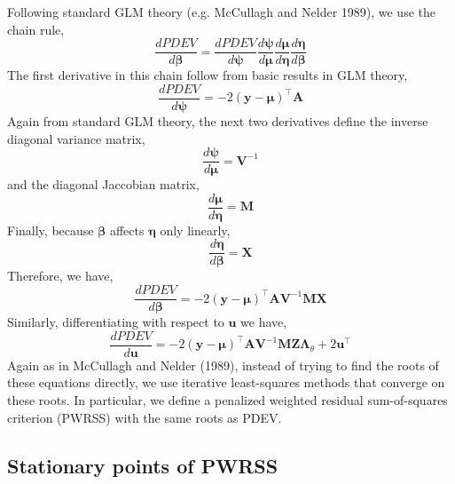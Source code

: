 \documentclass{jss}
\begin{document}
Following standard GLM theory (e.g. McCullagh and Nelder 1989), we use the chain rule,
\begin{displaymath}
\frac{d PDEV}{d \bm\beta} = 
\frac{d PDEV}{d \bm\psi}
\frac{d \bm\psi}{d \bm\mu}
\frac{d \bm\mu}{d \bm\eta}
\frac{d \bm\eta}{d \bm\beta}
\end{displaymath}
The first derivative in this chain follow from basic results in GLM theory,
\begin{displaymath}
\frac{d PDEV}{d \bm\psi} = 
-2(\bm y - \bm\mu)^\top \bm A
\end{displaymath}
Again from standard GLM theory, the next two derivatives define the inverse diagonal variance
matrix,
\begin{displaymath}
\frac{d \bm\psi}{d \bm\mu} = \bm V^{-1}
\end{displaymath}
and the diagonal Jaccobian matrix,
\begin{displaymath}
\frac{d \bm\mu}{d \bm\eta} = \bm M
\end{displaymath}
Finally, because $\bm\beta$ affects $\bm\eta$ only linearly,
\begin{displaymath}
\frac{d \bm\eta}{d \bm\beta} = \bm X
\end{displaymath}
Therefore, we have,
\begin{equation}
\frac{d PDEV}{d \bm\beta} = 
-2(\bm y - \bm\mu)^\top \bm A
\bm V^{-1}
\bm M
\bm X
\label{eq:dPDEVdbeta}
\end{equation}
Similarly, differentiating with respect to $\bm u$ we have,
\begin{equation}
\frac{d PDEV}{d \bm u} = 
-2(\bm y - \bm\mu)^\top \bm A
\bm V^{-1}
\bm M
\bm Z \bm\Lambda_\theta +
2\bm u^\top
\label{eq:dPDEVdu}
\end{equation}
Again as in McCullagh and Nelder (1989), instead of trying to find the
roots of these equations directly, we use iterative least-squares
methods that converge on these roots. In particular, we define a
penalized weighted residual sum-of-squares criterion (PWRSS) with the same
roots as PDEV.

\subsection{Stationary points of PWRSS}
\end{document}
